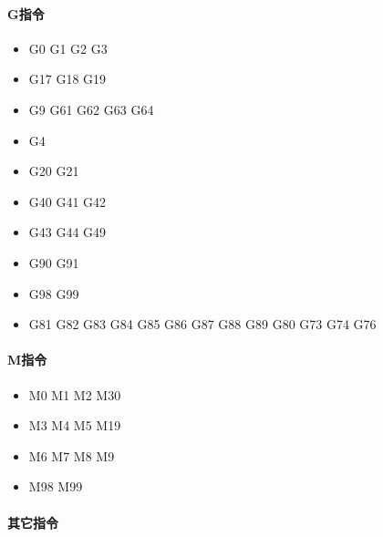 \paragraph{G指令}\begin{itemize}
	\item G0 G1 G2 G3

	\item G17 G18 G19

	\item G9 G61 G62 G63 G64

	\item G4 

	\item G20 G21

	\item G40 G41 G42 

	\item G43 G44 G49

	\item G90 G91

	\item G98 G99

	\item G81 G82 G83 G84 G85 G86 G87 G88 G89 G80 G73 G74 G76

\end{itemize}

\paragraph{M指令}

\begin{itemize}
	\item M0 M1 M2 M30

	\item M3 M4 M5 M19

	\item M6 M7 M8 M9

	\item M98 M99

\end{itemize}

\paragraph{其它指令}
